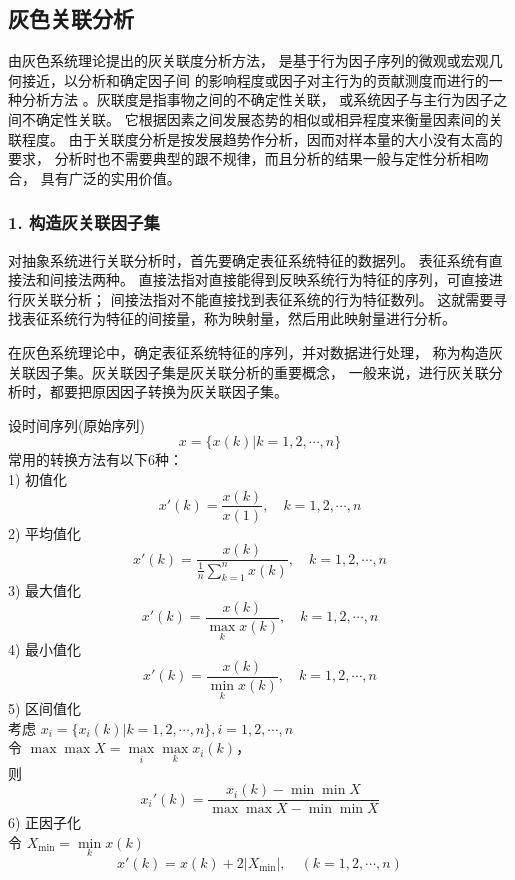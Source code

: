 \subsection{灰色关联分析}
由灰色系统理论提出的灰关联度分析方法，
是基于行为因子序列的微观或宏观几何接近，以分析和确定因子间
的影响程度或因子对主行为的贡献测度而进行的一种分析方法
。灰联度是指事物之间的不确定性关联，
或系统因子与主行为因子之间不确定性关联。
它根据因素之间发展态势的相似或相异程度来衡量因素间的关联程度。
由于关联度分析是按发展趋势作分析，因而对样本量的大小没有太高的要求，
分析时也不需要典型的跟不规律，而且分析的结果一般与定性分析相吻合，
具有广泛的实用价值。

\subsubsection*{1. 构造灰关联因子集}
对抽象系统进行关联分析时，首先要确定表征系统特征的数据列。
表征系统有直接法和间接法两种。
直接法指对直接能得到反映系统行为特征的序列，可直接进行灰关联分析；
间接法指对不能直接找到表征系统的行为特征数列。
这就需要寻找表征系统行为特征的间接量，称为映射量，然后用此映射量进行分析。

在灰色系统理论中，确定表征系统特征的序列，并对数据进行处理，
称为构造灰关联因子集。灰关联因子集是灰关联分析的重要概念，
一般来说，进行灰关联分析时，都要把原因因子转换为灰关联因子集。

设时间序列(原始序列)
\begin{equation}
x=\{x(k)|k=1,2, \cdots ,n\}
\end{equation}
常用的转换方法有以下6种： \\
1) 初值化
\begin{equation}
x'(k)=\frac{x(k)}{x(1)}, \quad k=1,2, \cdots, n
\end{equation}
2) 平均值化
\begin{equation}
x'(k)=\frac{x(k)}{\frac{1}{n} \sum_{k=1}^n x(k)}, \quad k=1,2, \cdots, n
\end{equation}
3) 最大值化
\begin{equation}
x'(k)=\frac{x(k)}{\underset{k}{\max} x(k)}, \quad k=1,2, \cdots, n
\end{equation}
4) 最小值化
\begin{equation}
x'(k)=\frac{x(k)}{\underset{k}{\min} x(k)}, \quad k=1,2, \cdots, n
\end{equation}
5) 区间值化 \\
考虑 $x_i=\{x_i(k)|k=1,2, \cdots ,n\}, i=1,2, \cdots ,n$ \\
令 $\max\max X=\underset{i}{\max} \underset{k}{\max} x_i(k)$，\\
则
\begin{equation}
x_i'(k)=\frac{x_i(k)-\min\min X}{\max\max X - \min\min X}
\end{equation}
6) 正因子化 \\
令 $X_{\min}=\underset{k}{\min}x(k)$
\begin{equation}
x'(k)=x(k)+2|X_{\min}|, \quad (k=1,2, \cdots, n)
\end{equation}

